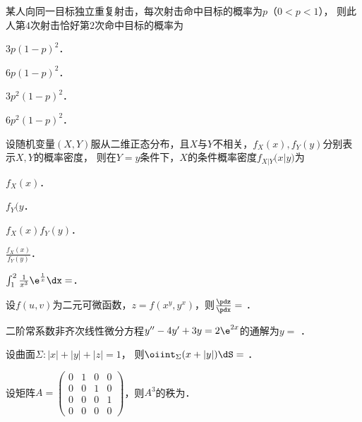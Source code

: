 \documentclass[plain,noanswer,medmath]{../../template/jnuexam}
\begin{document}
\begin{problem}
某人向同一目标独立重复射击，每次射击命中目标的概率为$p$（$0 < p < 1$），
则此人第$4$次射击恰好第$2$次命中目标的概率为 \pickout{}
\begin{abcd}
\item $3p(1 - p)^2$．
\item $6p(1 - p)^2$．
\item $3p^2(1 - p)^2$．
\item $6p^2(1 - p)^2$．
\end{abcd}
\end{problem}


\begin{problem}
设随机变量$(X,Y)$服从二维正态分布，且$X$与$Y$不相关，$f_X(x),f_Y(y)$分别表示$X,Y$的概率密度，
则在$Y = y$条件下，$X$的条件概率密度$f_{X\left| Y \right.}(x\left| y) \right.$为\pickout{}
\begin{abcd}
\item $f_X(x)$．
\item $f_Y(y$．
\item $f_X(x) f_Y(y)$．
\item $\frac{f_X(x)}{f_Y(y)}$．
\end{abcd}
\end{problem}




\begin{problem}
$\int_1^2\frac{1}{x^3} \e^{\frac{1}{x}} \dx =$\fillin{}．
\end{problem}


\begin{problem}
设$f(u,v)$为二元可微函数，$z = f(x^y,y^x)$，则$\frac{\pdz}{\pdx} =$ \fillin{}．
\end{problem}


\begin{problem}
二阶常系数非齐次线性微分方程$y'' - 4y' + 3y = 2\e^{2x}$的通解为$y=$ \fillin{}．
\end{problem}


\begin{problem}
设曲面$\Sigma :|x| + |y| + |z| = 1$，
则$\oiint_{\Sigma}(x + |y|) \dS =$ \fillin{}．
\end{problem}


\begin{problem}
设矩阵$A = \begin{pmatrix}
  0 & 1 & 0 & 0 \\
  0 & 0 & 1 & 0 \\
  0 & 0 & 0 & 1 \\
  0 & 0 & 0 & 0
\end{pmatrix}$，则$A^3$的秩为\fillin{}．
\end{problem}
\end{document}
